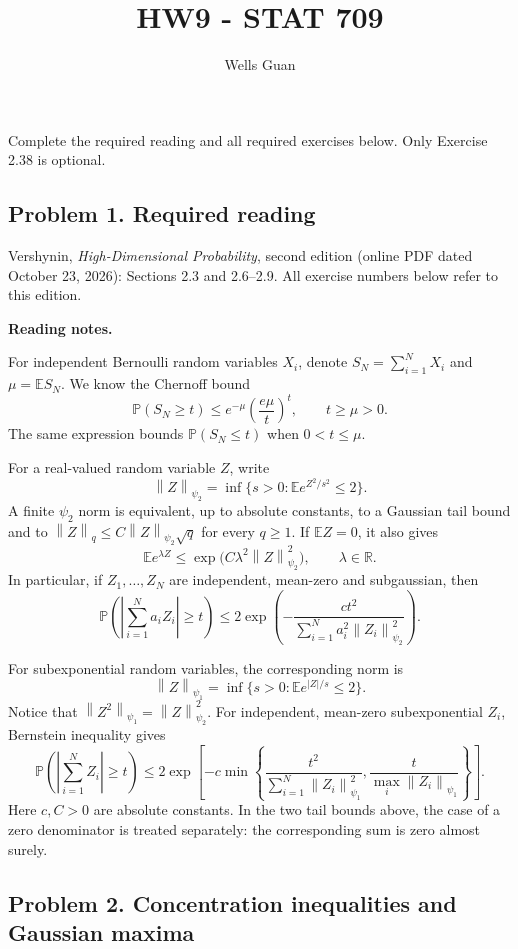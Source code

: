 \documentclass[lang=en,11pt,a4paper,citestyle=authoryear,nobib=true]{elegantpaper}
\title{HW9 - STAT 709}
\author{Wells Guan}
\newcommand{\R}{\mathbb{R}}
\newcommand{\E}{\mathbb{E}}
\renewcommand{\P}{\mathbb{P}}
\newcommand{\norm}[1]{\left\lVert#1\right\rVert}
\begin{document}
\maketitle

\noindent Complete the required reading and all required exercises below.
Only Exercise 2.38 is optional.

\subsection*{Problem 1. Required reading}
Vershynin, \textit{High-Dimensional Probability}, second edition
(online PDF dated October 23, 2026): Sections 2.3 and 2.6--2.9.
All exercise numbers below refer to this edition.

\par\vspace{0.5em}\noindent\textbf{Reading notes.}\par
For independent Bernoulli random variables $X_i$, denote
$S_N=\sum_{i=1}^N X_i$ and $\mu=\E S_N$. We know the Chernoff bound
\[
\P(S_N\ge t)\le e^{-\mu}\left(\frac{e\mu}{t}\right)^t,
\qquad t\ge\mu>0.
\]
The same expression bounds $\P(S_N\le t)$ when $0<t\le\mu$.

For a real-valued random variable $Z$, write
\[
\norm{Z}_{\psi_2}
=\inf\{s>0:\E e^{Z^2/s^2}\le2\}.
\]
A finite $\psi_2$ norm is equivalent, up to absolute constants, to a
Gaussian tail bound and to $\norm{Z}_q\le C\norm{Z}_{\psi_2}\sqrt q$
for every $q\ge1$. If $\E Z=0$, it also gives
\[
\E e^{\lambda Z}\le
\exp\bigl(C\lambda^2\norm{Z}_{\psi_2}^2\bigr),
\qquad \lambda\in\R.
\]
In particular, if $Z_1,\ldots,Z_N$ are independent, mean-zero and
subgaussian, then
\[
\P\left(\left|\sum_{i=1}^N a_iZ_i\right|\ge t\right)
\le2\exp\left(-\frac{ct^2}
{\sum_{i=1}^N a_i^2\norm{Z_i}_{\psi_2}^2}\right).
\]

For subexponential random variables, the corresponding norm is
\[
\norm{Z}_{\psi_1}=\inf\{s>0:\E e^{|Z|/s}\le2\}.
\]
Notice that $\norm{Z^2}_{\psi_1}=\norm{Z}_{\psi_2}^2$.
For independent, mean-zero subexponential $Z_i$, Bernstein inequality gives
\[
\P\left(\left|\sum_{i=1}^N Z_i\right|\ge t\right)
\le2\exp\left[
-c\min\left\{\frac{t^2}{\sum_{i=1}^N\norm{Z_i}_{\psi_1}^2},
\frac{t}{\max_i\norm{Z_i}_{\psi_1}}\right\}\right].
\]
Here $c,C>0$ are absolute constants. In the two tail bounds above,
the case of a zero denominator is treated separately: the corresponding
sum is zero almost surely.

\subsection*{Problem 2. Concentration inequalities and Gaussian maxima}
\end{document}
